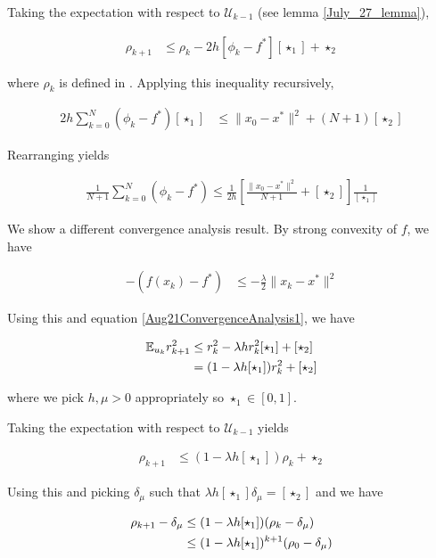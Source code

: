 \documentclass{article}
\begin{document}
Taking the expectation with respect to $\mathcal{U}_{k-1}$ (see lemma \ref{July_27_lemma}), 

\begin{align}
\rho_{k+1} & \leq \rho_k - 2h[\phi_k - f^*][\star_1] + \star_2
\end{align}

where $\rho_k$ is defined in \cite{Nesterov2015}. Applying this inequality recursively, 

\begin{align}
2h\sum_{k=0}^N(\phi_k-f^*)[\star_1] & \leq \|x_0 - x^*\|^2 + (N+1)[\star_2]
\end{align}

Rearranging yields

\begin{align}
\frac{1}{N+1}\sum_{k=0}^N(\phi_k - f^*) \leq \frac{1}{2h}\left[\frac{\|x_0 - x^*\|^2}{N+1} + [\star_2]\right]\frac{1}{[\star_1]}
\end{align}

We show a different convergence analysis result. By strong convexity of $f$, we have

\begin{align}
-(f(x_k) - f^*) & \leq -\frac{\lambda}{2}\|x_k-x^*\|^2
\end{align}

Using this and equation \eqref{Aug21ConvergenceAnalysis1}, we have 

\begin{align}
\mathbb{E}_{u_k}r_{k+1}^2 & \leq r_k^2 - \lambda hr_k^2[\star_1] + [\star_2] \notag \\ & = (1-\lambda h[\star_1])r_k^2 + [\star_2]
\end{align}

where we pick $h, \mu > 0$ appropriately so $\star_1 \in [0,1]$. \newline

Taking the expectation with respect to $\mathcal{U}_{k-1}$ yields 

\begin{align}
\rho_{k+1} & \leq (1- \lambda h [\star_1])\rho_k + \star_2
\end{align}

Using this and picking $\delta_{\mu}$ such that $\lambda h[\star_1]\delta_{\mu} = [\star_2]$ and we have 

\begin{align}
\rho_{k+1} - \delta_{\mu} & \leq (1 - \lambda h [\star_1])(\rho_k - \delta_{\mu}) \notag \\ & \leq (1 - \lambda h [\star_1])^{k+1}(\rho_0 - \delta_{\mu})
\end{align}
\end{document}
